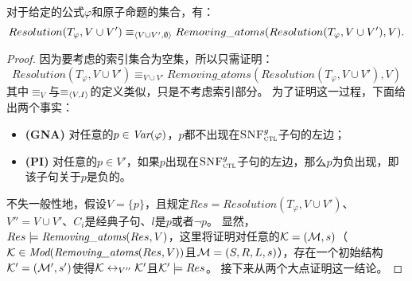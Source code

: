\begin{proposition}\label{pro:remove}
	对于给定的公式$\varphi$和原子命题的集合，有：
	$$Resolution(T_{\varphi}, V \cup V') \equiv_{{\langle{V \cup V', \emptyset}\rangle}}   Removing\_atoms(Resolution(T_{\varphi}, V \cup V'), V).$$
\end{proposition}
\begin{proof}
	因为要考虑的索引集合为空集，所以只需证明：
	$$Resolution(T_{\varphi}, V \cup V') \equiv_{V \cup V'}   Removing\_atoms(Resolution(T_{\varphi}, V \cup V'), V)$$
	其中$\equiv_V$与$\equiv_{{\langle{V,I}\rangle}}$的定义类似，只是不考虑索引部分。
	为了证明这一过程，下面给出两个事实：
	\begin{itemize}
		\item \textbf{(GNA)} 对任意的$p\in \textit{Var}(\varphi)$，$p$都不出现在${\textsc{SNF}_{\textsc{ctl}}^g}$子句的左边；
		\item \textbf{(PI)} 对任意的$p\in V'$，如果$p$出现在${\textsc{SNF}_{\textsc{ctl}}^g}$子句的左边，那么$p$为负出现，即该子句关于$p$是负的。
	\end{itemize}

不失一般性地，假设$V=\{p\}$，且规定$Res=Resolution(T_{\varphi}, V \cup V')$、$V''=V\cup V'$、$C_i$是经典子句、$l$是$p$或者$\neg p$。
显然，$Res \models \emph{Removing\_atoms}(Res, V)$，这里将证明对任意的${\cal K}=({\cal M}, s)$（${\cal K}\in \textit{Mod}(\emph{Removing\_atoms}(Res, V))$且${\cal M}=(S, R, L, s)$），存在一个初始结构${\cal K}'=({\cal M}', s')$使得${\cal K} \leftrightarrow_{V''} {\cal K}'$且${\cal K}' \models Res$。 
接下来从两个大点证明这一结论。


\end{proof}
